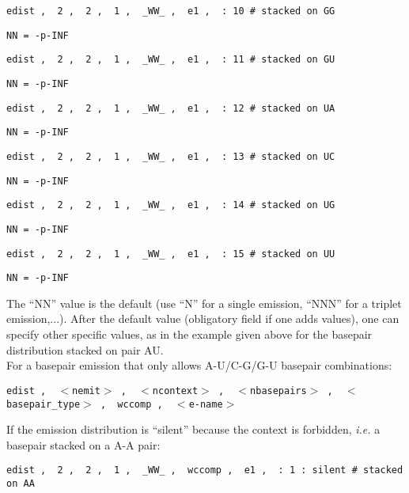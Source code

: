 \begin{footnotesize}
\noindent 
  \texttt{edist \sep\, 2 \sep\, 2 \sep\, 1 \sep\, \_WW\_ \sep\, e1 \sep\, : 10 \# stacked on GG}

\noindent\texttt{NN = -p-INF}

\noindent 
  \texttt{edist \sep\, 2 \sep\, 2 \sep\, 1 \sep\, \_WW\_ \sep\, e1 \sep\, : 11 \# stacked on GU}

\noindent\texttt{NN = -p-INF}

\noindent 
  \texttt{edist \sep\, 2 \sep\, 2 \sep\, 1 \sep\, \_WW\_ \sep\, e1 \sep\, : 12 \# stacked on UA}

\noindent\texttt{NN = -p-INF}

\noindent 
  \texttt{edist \sep\, 2 \sep\, 2 \sep\, 1 \sep\, \_WW\_ \sep\, e1 \sep\, : 13 \# stacked on UC}

\noindent\texttt{NN = -p-INF}

\noindent 
  \texttt{edist \sep\, 2 \sep\, 2 \sep\, 1 \sep\, \_WW\_ \sep\, e1 \sep\, : 14 \# stacked on UG}

\noindent\texttt{NN = -p-INF}

\noindent 
  \texttt{edist \sep\, 2 \sep\, 2 \sep\, 1 \sep\, \_WW\_ \sep\, e1 \sep\, : 15 \# stacked on UU}

\noindent\texttt{NN = -p-INF}\\

\end{footnotesize}

\noindent
The ``NN'' value is the default (use ``N'' for a single emission,
``NNN'' for a triplet emission,...). After the default value
(obligatory field if one adds values), one can specify other specific
values, as in the example given above for the basepair distribution
stacked on pair AU.\\

\noindent
For a basepair emission that only allows A-U/C-G/G-U basepair combinations:\\

\noindent
\begin{footnotesize}
\texttt{edist \sep\, $<$nemit$>$ \sep\, $<$ncontext$>$ \sep\, $<$nbasepairs$>$ \sep\, $<$basepair\_type$>$ \sep\, wccomp \sep\, $<$e-name$>$}\\
\end{footnotesize}

\noindent
If the emission distribution is ``silent'' because the context is forbidden, \textit{i.e.} a basepair stacked on a A-A pair:\\

\noindent
\begin{footnotesize}
  \texttt{edist \sep\, 2 \sep\, 2 \sep\, 1 \sep\, \_WW\_ \sep\, wccomp \sep\, e1 \sep\, : 1 : silent \# stacked on AA }\\
\end{footnotesize}



